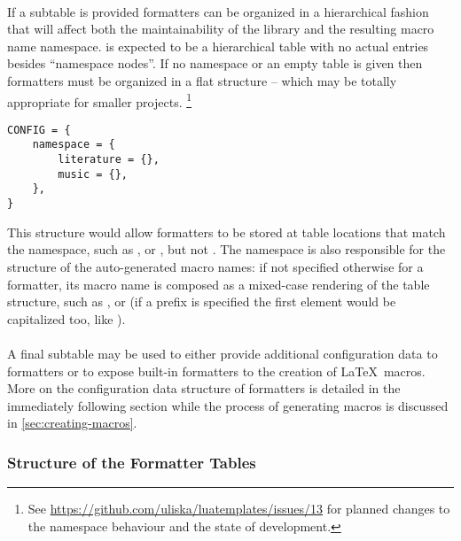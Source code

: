\documentclass{scrartcl}
\begin{document}
\paragraph{}

If a  subtable is provided formatters can be organized in a
hierarchical fashion that will affect both the maintainability of the library
and the resulting macro name namespace.  is expected to be a
hierarchical table with no actual entries besides “namespace nodes”.  If no
namespace or an empty table is given then formatters must be organized in a flat
structure -- which may be totally appropriate for smaller projects.%
\footnote{See \url{https://github.com/uliska/luatemplates/issues/13} for planned
changes to the namespace behaviour and the state of development.} %

\begin{verbatim}
CONFIG = {
    namespace = {
        literature = {},
        music = {},
    },
}
\end{verbatim}

\noindent This structure would allow formatters to be stored at table locations
that match the namespace, such as , 
or , but not .  The namespace is
also responsible for the structure of the auto-generated macro names: if not
specified otherwise for a formatter, its macro name is composed as a mixed-case
rendering of the table structure, such as ,
 or  (if a prefix is specified the
first element would be capitalized too, like ).


\paragraph{}

A final subtable  may be used to either provide additional
configuration data to formatters or to expose built-in formatters to the
creation of \LaTeX\ macros.  More on the configuration data structure of
formatters is detailed in the immediately following section while the process of
generating macros is discussed in \vref{sec:creating-macros}.


\subsubsection{Structure of the Formatter Tables}
\label{sec:structure-of-formatter-tables}
\end{document}
